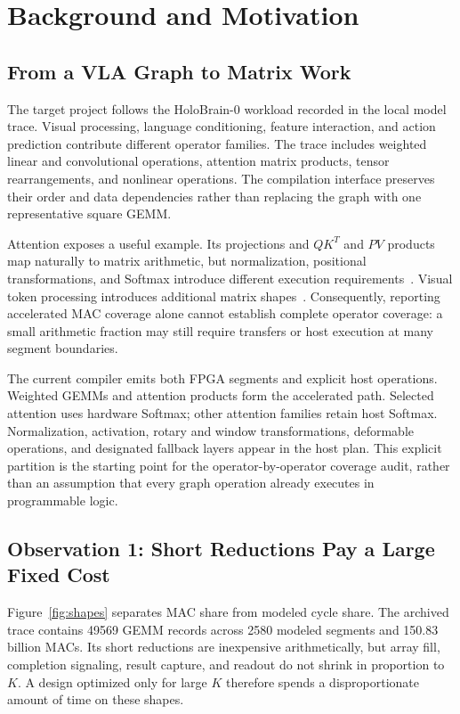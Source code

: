 \documentclass[10pt,conference,letterpaper]{IEEEtran}
\begin{document}
\section{Background and Motivation}
\subsection{From a VLA Graph to Matrix Work}
The target project follows the HoloBrain-0 workload recorded in the local model trace. Visual processing, language conditioning, feature interaction, and action prediction contribute different operator families. The trace includes weighted linear and convolutional operations, attention matrix products, tensor rearrangements, and nonlinear operations. The compilation interface preserves their order and data dependencies rather than replacing the graph with one representative square GEMM.

Attention exposes a useful example. Its projections and $QK^{T}$ and $PV$ products map naturally to matrix arithmetic, but normalization, positional transformations, and Softmax introduce different execution requirements~\cite{attention}. Visual token processing introduces additional matrix shapes~\cite{vit}. Consequently, reporting accelerated MAC coverage alone cannot establish complete operator coverage: a small arithmetic fraction may still require transfers or host execution at many segment boundaries.

The current compiler emits both FPGA segments and explicit host operations. Weighted GEMMs and attention products form the accelerated path. Selected attention uses hardware Softmax; other attention families retain host Softmax. Normalization, activation, rotary and window transformations, deformable operations, and designated fallback layers appear in the host plan. This explicit partition is the starting point for the operator-by-operator coverage audit, rather than an assumption that every graph operation already executes in programmable logic.

\subsection{Observation 1: Short Reductions Pay a Large Fixed Cost}
Figure~\ref{fig:shapes} separates MAC share from modeled cycle share. The archived trace contains 49569 GEMM records across 2580 modeled segments and 150.83 billion MACs. Its short reductions are inexpensive arithmetically, but array fill, completion signaling, result capture, and readout do not shrink in proportion to $K$. A design optimized only for large $K$ therefore spends a disproportionate amount of time on these shapes.
\end{document}
